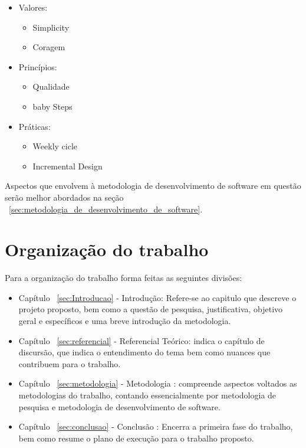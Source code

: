 \begin{itemize}
   \item Valores:
         \begin{itemize}
            \item Simplicity
            \item Coragem
         \end{itemize}
   \item Princípios:
         \begin{itemize}
            \item Qualidade
            \item baby Steps
         \end{itemize}
   \item Práticas:
         \begin{itemize}
            \item Weekly cicle
            \item Incremental Design
         \end{itemize}
\end{itemize}

Aspectos que envolvem à metodologia de desenvolvimento de software em questão
serão melhor abordados na seção
~\ref{sec:metodologia_de_desenvolvimento_de_software}.

\section{Organização do trabalho}

Para a organização do trabalho forma feitas as seguintes divisões:

\begin{itemize}
   \item Capítulo ~\ref{sec:Introducao} - Introdução: Refere-se ao capitulo que descreve
         o projeto proposto, bem como a questão de pesquisa, justificativa, objetivo
         geral e específicos e uma breve introdução da metodologia.
   \item Capítulo ~\ref{sec:referencial} - Referencial Teórico: indica o capítulo de
         discursão, que indica o entendimento do tema bem como nuances que contribuem
         para o trabalho.
   \item Capítulo ~\ref{sec:metodologia} - Metodologia : compreende aspectos voltados as
         metodologias do trabalho, contando essencialmente por metodologia de pesquisa e
         metodologia de desenvolvimento de software.
   \item Capítulo ~\ref{sec:conclusao} - Conclusão : Encerra a primeira fase do
         trabalho, bem como resume o plano de execução para o trabalho proposto.
\end{itemize}